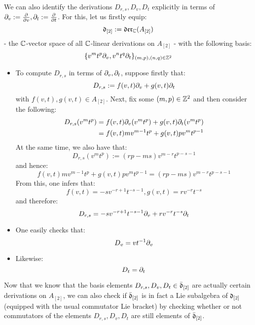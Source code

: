 \begin{remark}
                We can also identify the derivations $D_{r, s}, D_v, D_t$ explicitly in terms of $\partial_v := \frac{\partial}{\partial v}, \partial_t := \frac{\partial}{\partial t}$. For this, let us firstly equip:
                    $$\mathfrak{d}_{[2]} := \mathfrak{der}_{\mathbb{C}}(A_{[2]})$$
                - the $\mathbb{C}$-vector space of all $\mathbb{C}$-linear derivations on $A_{[2]}$ - with the following basis:
                    $$\{ v^m t^p \partial_v, v^n t^q \partial_t \}_{(m, p), (n, q) \in \mathbb{Z}^2}$$
                \begin{itemize}
                    \item To compute $D_{r, s}$ in terms of $\partial_v, \partial_t$, suppose firstly that:
                        $$D_{r, s} := f(v, t) \partial_v + g(v, t) \partial_t$$
                    with $f(v, t), g(v, t) \in A_{[2]}$. Next, fix some $(m, p) \in \mathbb{Z}^2$ and then consider the following:
                        $$
                            \begin{aligned}
                                D_{r, s}( v^m t^p ) & = f(v, t) \partial_v( v^m t^p ) + g(v, t) \partial_t( v^m t^p )
                                \\
                                & = f(v, t) m v^{m - 1} t^p + g(v, t) p v^m t^{p - 1}
                            \end{aligned}
                        $$
                    At the same time, we also have that:
                        $$D_{r, s}(v^m t^p) := ( rp - ms ) v^{m - r} t^{p - s - 1}$$
                    and hence:
                        $$f(v, t) m v^{m - 1} t^p + g(v, t) p v^m t^{p - 1} = ( rp - ms ) v^{m - r} t^{p - s - 1}$$
                    From this, one infers that:
                        $$f(v, t) = -s v^{-r + 1} t^{-s - 1}, g(v, t) = r v^{-r} t^{-s}$$
                    and therefore:
                        $$D_{r, s} = -s v^{-r + 1} t^{-s - 1} \partial_v + r v^{-r} t^{-s} \partial_t$$
                    \item One easily checks that:
                        $$D_v = v t^{-1} \partial_v$$
                    \item Likewise:
                        $$D_t = \partial_t$$
                \end{itemize}

                Now that we know that the basis elements $D_{r, s}, D_v, D_t \in \bar{\mathfrak{d}}_{[2]}$ are actually certain derivations on $A_{[2]}$, we can also check if $\bar{\mathfrak{d}}_{[2]}$ is in fact a Lie subalgebra of $\mathfrak{d}_{[2]}$ (equipped with the usual commutator Lie bracket) by checking whether or not commutators of the elements $D_{r, s}, D_v, D_t$ are still elements of $\bar{\mathfrak{d}}_{[2]}$.
            \end{remark}

